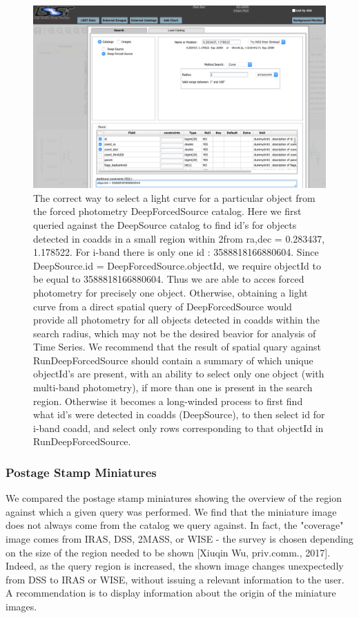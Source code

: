 \documentclass[DM,lsstdraft,toc]{lsstdoc}
\begin{document}
\begin{figure}
\includegraphics[width=\textwidth]{figs/4_PDAC_cone_DeepForcedSource}
\caption{The correct way to select a light curve for a  particular object from the forced photometry DeepForcedSource catalog.  Here we first queried against the DeepSource catalog to find  id's for objects detected in coadds in a small region within 2\arcsec from ra,dec =  0.283437\degree, 1.178522\degree. For i-band there is only one id :  3588818166880604. Since DeepSource.id =  DeepForcedSource.objectId,  we require objectId to be equal to  3588818166880604. Thus we are able to acces forced photometry for precisely one object.  Otherwise, obtaining a light curve from a direct spatial  query of DeepForcedSource would provide all photometry for all objects detected in coadds within the search radius, which may not be the desired beavior for analysis of Time Series. We recommend that the result of spatial quary against RunDeepForcedSource should contain a summary of which unique objectId's are present,  with an ability to select only one object (with multi-band photometry), if more than one is present in the search region. Otherwise it becomes a long-winded process to first find what id's were detected in coadds (DeepSource), to then select id for i-band coadd, and select only rows corresponding to that objectId in RunDeepForcedSource.}
\label{fig:PDAC_cone_DFS}
\end{figure}

\subsubsection{Postage Stamp Miniatures }
\label{sec:miniatures}


We compared the postage stamp miniatures showing the overview of the region against which a given query was performed. We find that the miniature image does not always come from the catalog we query against.  In fact, the "coverage" image comes from IRAS, DSS, 2MASS, or WISE -  the survey is chosen depending on the size of the region needed to be shown [Xiuqin Wu, priv.comm., 2017].  Indeed, as the query region is increased,  the shown image changes unexpectedly from DSS to IRAS or WISE, without issuing a relevant information to the user.  A recommendation is to display information about the origin of the miniature images.
\end{document}

